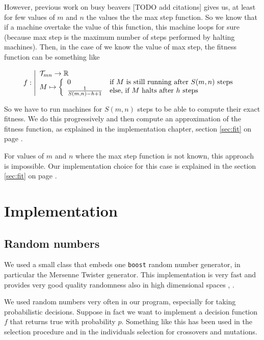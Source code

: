 \documentclass{report}
\begin{document}
However, previous work on busy beavers \cite{rado} [TODO add citations] gives us, at least for few values of $m$ and $n$ the values the the max step function. So we know that if a machine overtake the value of this function, this machine loops for sure (because max step is the maximum number of steps performed by halting machines). Then, in the case of we know the value of max step, the fitness function can be something like

\[
f : \left |
  \begin{array}{l}
    \mathcal{T}_{mn} \to \mathbb{R}\\
    M  \mapsto \left \{
  \begin{array}{ll}
    0&\text{if } M \text{ is still running after } S(m,n) \text{ steps}\\
    \frac{1}{S(m,n) - h + 1}&\text{else, if } M \text{ halts after } h \text{ steps}
  \end{array} \right .
  \end{array}
\right .
\]

So we have to run machines for $S(m,n)$ steps to be able to compute their exact fitness. We do this progressively and then compute an approximation of the fitness function, as explained in the implementation chapter, section \ref{sec:fit} on page \pageref{sec:fit}.

For values of $m$ and $n$ where the max step function is not known, this approach is impossible. Our implementation choice for this case is explained in the section \ref{sec:fit} on page \pageref{sec:fit}.

\chapter{Implementation}
\label{chap:impl}

\section{Random numbers}
\label{sec:random}
We used a small class that embeds one \texttt{boost} random number generator, in particular the Mersenne Twister generator. This implementation is very fast and provides very good quality randomness also in high dimensional spaces \cite{boost-random}, \cite{mersenne-twister}.

We used random numbers very often in our program, especially for taking probabilistic decisions. Suppose in fact we want to implement a decision function $f$ that returns true with probability $p$. Something like this has been used in the selection procedure and in the individuals selection for crossovers and mutations.
\end{document}
